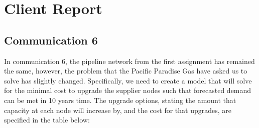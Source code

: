 \documentclass{article}
\begin{document}
\newpage
\section{Client Report}
\subsection{Communication 6}
In communication 6, the pipeline network from the first assignment has remained the same, however, the problem that the Pacific Paradise Gas have asked us to solve has slightly changed. Specifically, we need to create a model that will solve for the minimal cost to upgrade the supplier nodes such that forecasted demand can be met in 10 years time. The upgrade options, stating the amount that capacity at each node will increase by, and the cost for that upgrades, are specified in the table below:
\end{document}
